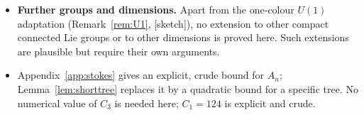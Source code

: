 \documentclass[11pt,a4paper]{article}
\theoremstyle{plain}
\theoremstyle{definition}
\theoremstyle{remark}
\numberwithin{equation}{section}
\newcommand{\E}{\mathbb{E}}
\newcommand{\st}[1]{\textsf{[#1]}}
\begin{document}
\begin{itemize}
For $S_{\beta,p}:=\beta(1-W_p)$, passing quadratic moments from weak convergence would also require actual uniform integrability of
$S_{\beta,p}^2$, for example
\[
\lim_{M\to\infty}\sup_{\beta\ge2}
\E_{\mu_\beta}\!\left[
S_{\beta,p}^2\mathbf1_{\{S_{\beta,p}^2>M\}}
\right]=0.
\]
The bound $\sup_\beta\E S_{\beta,p}^2<\infty$ alone does not imply this condition.
A uniform $L^{2+\varepsilon}$ bound for $S_{\beta,p}$, for some $\varepsilon>0$, would suffice.
Neither this pure-Maxwell identification nor the moment control sufficient to pass these quadratic correlations to the limit is
proved here.
Without reflection positivity, fixed-distance information alone does not control an exponential decay rate.
\item \textbf{Further groups and dimensions.}
Apart from the one-colour $U(1)$ adaptation (Remark~\ref{rem:U1}, \st{sketch}), no extension to other compact connected Lie groups or to
other dimensions is proved here. Such extensions are plausible but require their own arguments.
\item Appendix~\ref{app:stokes} gives an explicit, crude bound for $A_n$; Lemma~\ref{lem:shorttree} replaces it by a quadratic bound for a specific tree.
No numerical value of $C_3$ is needed here; $C_1=124$ is explicit and crude.
\end{itemize}
\end{document}
